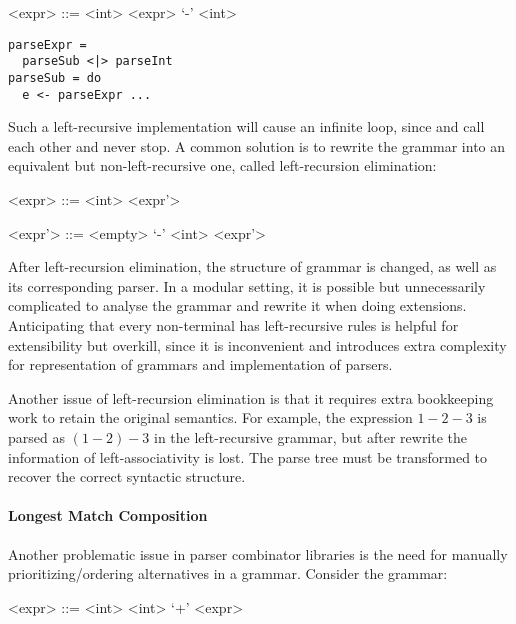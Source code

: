 \begin{minipage}{12em}
\setlength{\grammarindent}{4em}
\begin{grammar}
<expr> ::= <int> \alt <expr> `-' <int>
\end{grammar}
\end{minipage}
\begin{minipage}{15em}
\begin{lstlisting}[language=PlainCode]
parseExpr =
  parseSub <|> parseInt
parseSub = do
  e <- parseExpr ...
\end{lstlisting}
\end{minipage}
Such a left-recursive implementation will cause an infinite loop, since  and  call each other and never stop.
A common solution is to rewrite the grammar into an equivalent but non-left-recursive one, called left-recursion elimination:

\vspace{0.4\baselineskip}
\begin{minipage}{15em}
\setlength{\grammarindent}{5em}
\begin{grammar}
<expr> ::= <int> <expr'>

<expr'> ::= <empty> \alt `-' <int> <expr'>
\end{grammar}
\end{minipage}
\vspace{0.4\baselineskip}

\noindent After left-recursion elimination, the structure of grammar is changed,
as well as its corresponding parser. In a modular setting, it is
possible but unnecessarily complicated to analyse the grammar and
rewrite it when doing extensions. Anticipating that every non-terminal
has left-recursive rules is helpful for extensibility but overkill,
since it is inconvenient and introduces extra complexity for
representation of grammars and implementation of parsers.

Another issue of left-recursion elimination is that it requires extra
bookkeeping work to retain the original semantics. For example, the
expression $1-2-3$ is parsed as $(1-2)-3$ in the left-recursive
grammar, but after rewrite the information of left-associativity is lost. The parse tree
must be transformed to recover the correct syntactic structure.

\paragraph{Longest Match Composition} Another problematic issue
in parser combinator libraries is the need for manually prioritizing/ordering
alternatives in a grammar.
Consider the grammar:
\setlength{\grammarindent}{5em}
\begin{grammar}
<expr> ::= <int> \alt <int> `+' <expr>
\end{grammar}


